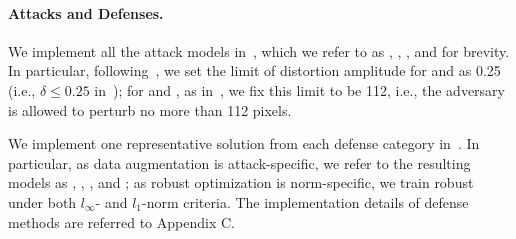 
%
%
%
%
%


\paragraph*{Attacks and Defenses.\;} We implement all the attack models in~, which we refer to as \ttg, \tth, \ttp, and \ttca for brevity. In particular, following~\cite{Goodfellow:2014:arxiv,Huang:2015:arxiv}, we set the limit of distortion amplitude for \ttg and \ttha as 0.25 (i.e., $\delta \leq 0.25$ in~); for \ttp and \ttca, as in~\cite{Papernot:2016:sp}, we fix this limit to be 112, i.e., the adversary is allowed to perturb no more than 112 pixels.

We implement one representative solution from each defense category in~. In particular, as data augmentation is attack-specific, we refer to the resulting models as \ttg, \tth, \ttp, and {\ttct} \dnn; as robust optimization is norm-specific, we train robust \dnns under both $l_\infty$- and $l_1$-norm criteria. The implementation details of defense methods are referred to Appendix C.



